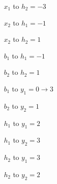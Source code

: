 \begin{enumerate}[label=(\alph*)]
\begin{tcolorbox}[title={Solution}]
		      $x_1$ to $h_2 = -3$

		      $x_2$ to $h_1 = -1$

		      $x_2$ to $h_2 = 1$

		      $b_1$ to $h_1 = -1$

		      $b_2$ to $h_2 = 1$

		      $b_1$ to $y_1 = 0 \rightarrow 3$

		      $b_2$ to $y_2 = 1$

		      $h_1$ to $y_1 = 2$

		      $h_1$ to $y_2 = 3$

		      $h_2$ to $y_1 = 3$

		      $h_2$ to $y_2 = 2$

	      \end{tcolorbox}

\end{enumerate}

